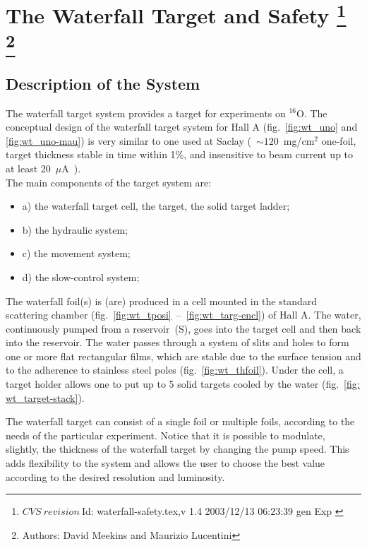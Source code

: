 \chapter[The Waterfall Target and Safety]{The Waterfall Target and Safety
\footnote{
  $CVS~revision~ $Id: waterfall-safety.tex,v 1.4 2003/12/13 06:23:39 gen Exp $ $
}
\footnote{Authors: David Meekins  and 
 Maurizio Lucentini }
}

\section{Description of the System}

The waterfall target system provides a target for experiments on $^{16}$O.
The conceptual design of the waterfall target system for Hall A (fig.~\ref{fig:wt_uno}
and \ref{fig:wt_uno-mau}) is very similar to one used at Saclay (~$\sim 120$~mg/cm$^{2}$
one-foil, target thickness stable in time within 1\%, and insensitive
to beam current up to at least 20~$\mu $A~\cite{Garibaldi:1992mb}).\\


The main components of the target system are: 

\begin{itemize}
\item a) the waterfall target cell, the target, the solid target ladder; 
\item b) the hydraulic system; 
\item c) the movement system; 
\item d) the slow-control system; 
\end{itemize}
The waterfall foil(s) is (are) produced in a cell mounted in the standard
scattering chamber (fig.~\ref{fig:wt_tposi}~--~\ref{fig:wt_targ-encl}) of Hall
A. The water, continuously pumped from a reservoir~(S), goes into
the target cell and then back into the reservoir. The water passes
through a system of slits and holes to form one or more flat rectangular
films, which are stable due to the surface tension and to the adherence
to stainless steel poles (fig.~\ref{fig:wt_thfoil}). Under the cell, a
target holder allows one to put up to 5 solid targets cooled by the
water (fig.~\ref{fig: wt_target-stack}).

The waterfall target can consist of a single foil or multiple foils,
according to the needs of the particular experiment. Notice that it
is possible to modulate, slightly, the thickness of the waterfall
target by changing the pump speed. This adds flexibility to the system
and allows the user to choose the best value according to the desired
resolution and luminosity.

